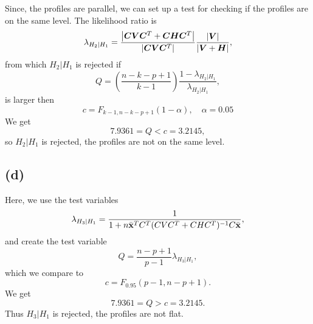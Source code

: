 Since, the profiles are parallel, we can set up a test for checking if
the profiles are on the same level. The likelihood ratio is 
\begin{equation*}
  \lambda_{H_2 | H_1} = \frac{\left| \bm{C}\bm{V} \bm{C}^{T} + \bm{C} \bm{H}\bm{C}^T \right|}{\left| \bm{C}\bm{V} \bm{C}^T \right|}\frac{\left| \bm{V} \right|}{\left| \bm{V}+\bm{H} \right|},
\end{equation*}
from which $H_{2}|H_{1}$ is rejected if 
\begin{equation*}
  Q = \left(\frac{n-k - p +1}{k - 1}\right)\frac{1 - \lambda_{H_2 |H_1}}{\lambda_{H_2 | H_1}},
\end{equation*}
is larger then 
\begin{equation*}
  c = F_{k-1, n - k - p +1} (1 - \alpha), \quad \alpha = 0.05
\end{equation*}
We get
\begin{equation*}
 7.9361  = Q < c = 3.2145,
\end{equation*}
so $H_2 | H_1$ is rejected, the profiles are not on the same level.

\subsection*{(d)}
\label{sec:d-1}

Here, we use the test variables 
\begin{equation*}
  \lambda_{H_3 | H_1} = \frac{1}{1 + n \bar{\bf x}^T C^T (CVC^T +
    CHC^T)^{-1}C\bar{\bf x}},
\end{equation*}
and create the test variable
\begin{equation*}
  Q = \frac{n - p +1}{p - 1}\lambda_{H_3 |H_1},
\end{equation*}
which we compare to 
\begin{equation*}
  c = F_{0.95}(p-1, n-p+1).
\end{equation*}
We get
\begin{equation*}
  7.9361 = Q > c = 3.2145.
\end{equation*}
Thus $H_3 | H_1$ is rejected, the profiles are not flat.
